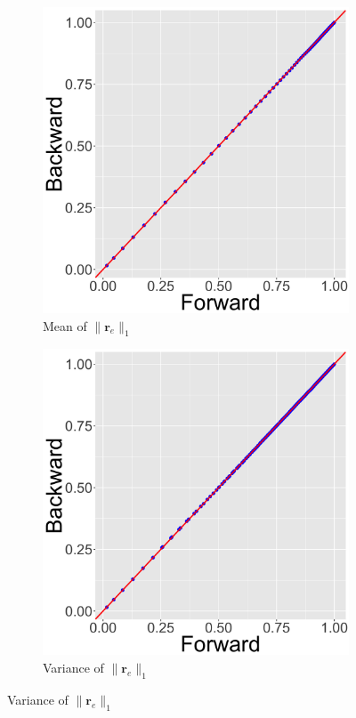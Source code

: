 \documentclass[ba]{imsart}
\numberwithin{equation}{section}
\theoremstyle{plain}
\begin{document}
		\begin{figure}[!t]
			\centering
			\begin{subfigure}[b]{0.2425\textwidth}
				\caption{Mean of $\lVert \boldsymbol{r}_{e} \rVert_1 $}
				\includegraphics[width=\textwidth]{img/plot1.png}	
			\end{subfigure}
			\begin{subfigure}[b]{0.2425\textwidth}
				\caption{Variance of $\lVert \boldsymbol{r}_{e} \rVert_1 $}
				\includegraphics[width=\textwidth]{img/plot2.png}	

\end{subfigure}
\end{figure}
\end{document}
